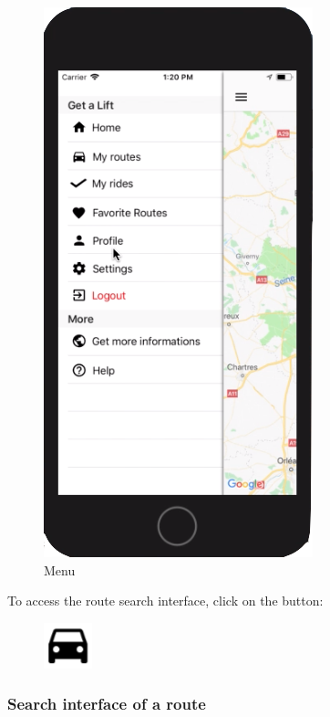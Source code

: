 \begin{figure}[h!]
\begin{center}
\includegraphics[scale = 0.3]{diagrams/Menu.png} 
\end{center}
\caption{Menu}
\end{figure}

To access the route search interface, click on the button:
\begin{figure}[h!]
\begin{center}
\includegraphics[scale = 0.3]{diagrams/SearchButton.png} 
\end{center}
\end{figure}

\subsubsection{Search interface of a route}

